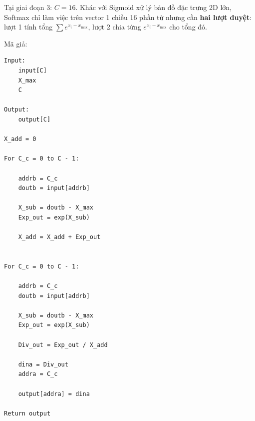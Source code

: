 \documentclass{uetgraduation}
\begin{document}
Tại giai đoạn 3: $C = 16$. Khác với Sigmoid xử lý bản đồ đặc trưng 2D lớn,
Softmax chỉ làm việc trên vector 1 chiều 16 phần tử nhưng cần
\textbf{hai lượt duyệt}: lượt 1 tính tổng $\sum e^{x_i - x_{\max}}$,
lượt 2 chia từng $e^{x_i - x_{\max}}$ cho tổng đó.

Mã giả:
\begin{Verbatim}[frame=single]
Input:
    input[C]
    X_max
    C

Output:
    output[C]

X_add = 0

For C_c = 0 to C - 1:

    addrb = C_c
    doutb = input[addrb]

    X_sub = doutb - X_max
    Exp_out = exp(X_sub)

    X_add = X_add + Exp_out


For C_c = 0 to C - 1:

    addrb = C_c
    doutb = input[addrb]

    X_sub = doutb - X_max
    Exp_out = exp(X_sub)

    Div_out = Exp_out / X_add

    dina = Div_out
    addra = C_c

    output[addra] = dina

Return output
\end{Verbatim}
\end{document}
